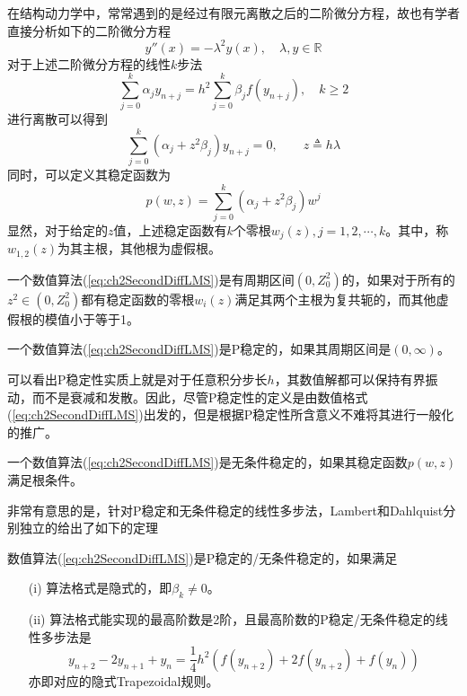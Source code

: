 在结构动力学中，常常遇到的是经过有限元离散之后的二阶微分方程，故也有学者直接分析如下的二阶微分方程
\begin{equation}
y''(x)=-\lambda^2y(x),\quad \lambda,y\in\mathbb{R}
\end{equation}
对于上述二阶微分方程的线性$k$步法
\begin{equation}
\sum_{j=0}^{k}\alpha_jy_{n+j}=h^2\sum_{j=0}^{k}\beta_jf(y_{n+j}),\quad k\ge2\label{eq:ch2SecondDiffLMS}
\end{equation}
进行离散可以得到\begin{equation}
\sum_{j=0}^{k}(\alpha_j+z^2\beta_j)y_{n+j}=0,\qquad z\triangleq h\lambda
\end{equation}
同时，可以定义其稳定函数为\begin{equation}
p(w,z)=\sum_{j=0}^{k}(\alpha_j+z^2\beta_j)w^j
\end{equation}
显然，对于给定的$z$值，上述稳定函数有$k$个零根$w_j(z),j=1,2,\cdots,k$。其中，称$w_{1,2}(z)$为其主根，其他根为虚假根。
\begin{definition}[周期区间]
一个数值算法(\ref{eq:ch2SecondDiffLMS})是有周期区间$(0,Z_0^2)$的\cite{Lambert1976}，如果对于所有的$z^2\in(0,Z_0^2)$都有稳定函数的零根$w_i(z)$满足其两个主根为复共轭的，而其他虚假根的模值小于等于1。
\end{definition}
\begin{definition}[P稳定性]
一个数值算法(\ref{eq:ch2SecondDiffLMS})是P稳定的\cite{Lambert1976}，如果其周期区间是$(0,\infty)$。
\end{definition}
可以看出P稳定性实质上就是对于任意积分步长$h$，其数值解都可以保持有界振动，而不是衰减和发散。因此，尽管P稳定性的定义是由数值格式(\ref{eq:ch2SecondDiffLMS})出发的，但是根据P稳定性所含意义不难将其进行一般化的推广。

\begin{definition}[无条件稳定性]
一个数值算法(\ref{eq:ch2SecondDiffLMS})是无条件稳定的\cite{Dahlquist1978}，如果其稳定函数$p(w,z)$满足根条件。
\end{definition}
非常有意思的是，针对P稳定和无条件稳定的线性多步法，Lambert\cite{Lambert1976}和Dahlquist\cite{Dahlquist1978}分别独立的给出了如下的定理
\begin{theorem}
数值算法(\ref{eq:ch2SecondDiffLMS})是P稳定的/无条件稳定的，如果满足
\begin{itemize}
\item[(i)] 算法格式是隐式的，即$\beta_k\neq0$。
\item[(ii)] 算法格式能实现的最高阶数是2阶，且最高阶数的P稳定/无条件稳定的线性多步法是
\begin{equation}
y_{n+2}-2y_{n+1}+y_n=\frac{1}{4}h^2(f(y_{n+2})+2f(y_{n+2})+f(y_n))
\end{equation}
亦即对应的隐式Trapezoidal规则。
\end{itemize}
\end{theorem}

